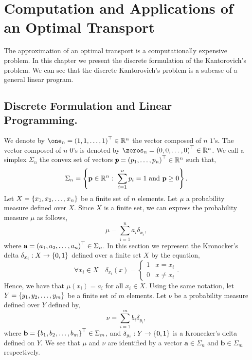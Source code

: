 \chapter{Computation and Applications of an Optimal Transport}
The approximation of an optimal transport is a computationally expensive problem.  In this chapter we present the discrete formulation of the Kantorovich's problem. We can see that the discrete Kantorovich's problem is a subcase of a general linear program.
\section{Discrete Formulation and Linear Programming.}
We denote by $\one_n=\parentheses{1,1,\dots,1}^\top\in \Real^n$ the vector composed of $n$ $1$'s. The vector composed of $n$ $0$'s is denoted by $\zeros_n=\parentheses{0,0,\dots, 0}^\top\in\Real^n$. We call a simplex $\Sigma_n$ the convex set of vectors $\pmb{p}=\left( p_1, \dots, p_n \right)^\top\in \mathbb{R}^n$ such that, 
\begin{equation}
	\Sigma_n=\braces{\mathbf{p} \in \Real^n: \ \sum_{i=1}^{n}{p_i}=1\ \mand\ \mathbf{p}\geq 0 }.
\end{equation}
Let $X=\left\lbrace x_1, x_2, \dots, x_n \right\rbrace$ be a finite set of $n$ elements. Let $\mu$ a probability measure defined over $X$. Since $X$ is a finite set, we can express the probability measure $\mu$ as follows,
\begin{equation}
	\mu=\sum_{i=1}^{n} a_i \delta_{x_i},
\end{equation}
where $\mathbf{a}=\left( a_1, a_2, \dots, a_n \right)^\top \in \Sigma_n$. In this section we represent the Kronocker's delta $\delta_{x_i}: X\to \left\lbrace 0,1 \right\rbrace$ defined over a finite set $X$ by the equation,
\begin{equation*}
\forall x_i\in X\quad	\delta_{x_i}(x)=\begin{cases}
	1 & x=x_i \\
	0 & x\neq x_i
	\end{cases}.
\end{equation*}  
Hence, we have that $\mu(x_i)=a_i$ for all $x_i\in X$. Using the same notation, let $Y=\left\lbrace y_1, y_2, \dots, y_m \right\rbrace$ be a finite set of $m$ elements. Let $\nu$ be a probability measure defined over $Y$ defined by,
\begin{equation}
	\nu=\sum_{i=1}^{m} b_i \delta_{y_i},
\end{equation}
where $\mathbf{b}=\left\lbrace b_1, b_2, \dots, b_m \right\rbrace^\top\in \Sigma_m$,  and $\delta_{y_i}: Y\to\left\lbrace 0,1 \right\rbrace$ is a Kronecker's delta defined on $Y$. We see that $\mu$ and $\nu$ are identified by a vector $\mathbf{a}\in \Sigma_n$ and $\mathbf{b}\in \Sigma_m$ respectively. 

